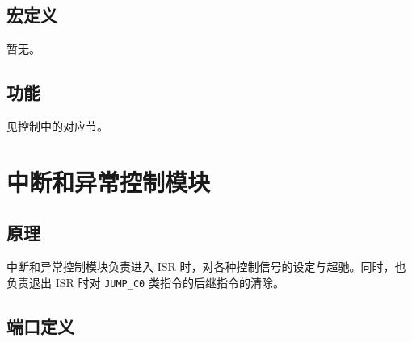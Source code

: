 \documentclass[12pt,AutoFakeBold,AutoFakeSlant]{article}
\newcommand{\ms}[1]{\texttt{#1}}
\begin{document}
\subsection{宏定义}

暂无。

\subsection{功能}

见控制中的对应节。

\section{中断和异常控制模块}

\subsection{原理}

中断和异常控制模块负责进入 ISR 时，对各种控制信号的设定与超驰。同时，也负责退出 ISR 时对 \ms{JUMP\_C0} 类指令的后继指令的清除。

\subsection{端口定义}
\end{document}
